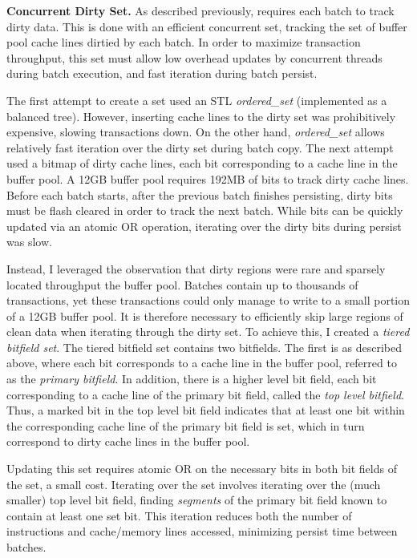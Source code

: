 \textbf{Concurrent Dirty Set.}
As described previously, \GroupCommit requires each batch to track dirty data.
This is done with an efficient concurrent set, tracking the set of buffer pool cache lines dirtied by each batch.
In order to maximize transaction throughput, this set must allow low overhead updates by concurrent threads during batch execution, and fast iteration during batch persist.

The first attempt to create a set used an STL \emph{ordered\_set} (implemented as a balanced tree).
However, inserting cache lines to the dirty set was prohibitively expensive, slowing transactions down.
On the other hand, \emph{ordered\_set} allows relatively fast iteration over the dirty set during batch copy.
The next attempt used a bitmap of dirty cache lines, each bit corresponding to a cache line in the buffer pool.
A 12GB buffer pool requires 192MB of bits to track dirty cache lines.
Before each batch starts, after the previous batch finishes persisting, dirty bits must be flash cleared in order to track the next batch.
While bits can be quickly updated via an atomic OR operation, iterating over the dirty bits during persist was slow.

Instead, I leveraged the observation that dirty regions were rare and sparsely located throughput the buffer pool.
Batches contain up to thousands of transactions, yet these transactions could only manage to write to a small portion of a 12GB buffer pool.
It is therefore necessary to efficiently skip large regions of clean data when iterating through the dirty set.
To achieve this, I created a \emph{tiered bitfield set}.
The tiered bitfield set contains two bitfields.
The first is as described above, where each bit corresponds to a cache line in the buffer pool, referred to as the \emph{primary bitfield}.
In addition, there is a higher level bit field, each bit corresponding to a cache line of the primary bit field, called the \emph{top level bitfield}.
Thus, a marked bit in the top level bit field indicates that at least one bit within the corresponding cache line of the primary bit field is set, which in turn correspond to dirty cache lines in the buffer pool.

Updating this set requires atomic OR on the necessary bits in both bit fields of the set, a small cost.
Iterating over the set involves iterating over the (much smaller) top level bit field, finding \emph{segments} of the primary bit field known to contain at least one set bit.
This iteration reduces both the number of instructions and cache/memory lines accessed, minimizing persist time between batches.


